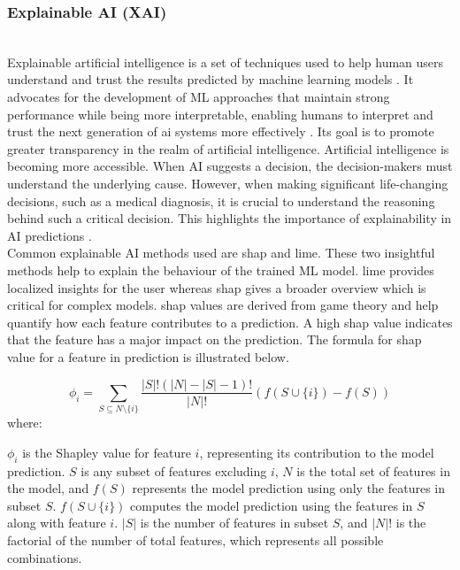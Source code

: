 \subsubsection{Explainable AI (XAI)} \leavevmode
\\Explainable artificial intelligence is a set of techniques used to help human users understand and trust the results predicted by machine learning models \citep{ibm2023explainable}. It advocates for the development of ML approaches that maintain strong performance while being more interpretable, enabling humans to interpret and trust the next generation of \gls{ai} systems more effectively \citep{arrieta2020explainable}. Its goal is to promote greater transparency in the realm of artificial intelligence. Artificial intelligence is becoming more accessible. When AI suggests a decision, the decision-makers must understand the underlying cause. However, when making significant life-changing decisions, such as a medical diagnosis, it is crucial to understand the reasoning behind such a critical decision. This highlights the importance of explainability in AI predictions \citep{adadi2018peeking}. \\
Common explainable AI methods used are \gls{shap} and \gls{lime}. These two insightful methods help to explain the behaviour of the trained ML model. \gls{lime} provides localized insights for the user whereas \gls{shap} gives a broader overview which is critical for complex models. \gls{shap} values are derived from game theory and help quantify how each feature contributes to a prediction. A high \gls{shap} value indicates that the feature has a major impact on the prediction. The formula for \gls{shap} value for a feature in prediction is illustrated below.\citep{molnar2024interpretable}

\[
\phi_i= \sum_{S \subseteq N \setminus \{i\}} \frac{|S|! (|N| - |S| - 1)!}{|N|!} \left( f(S \cup \{i\}) - f(S) \right) 
\] 
where:  \vspace{0.5em}

\(\phi_i\) is the Shapley value for feature \(i\), representing its contribution to the model prediction. \(S\) is any subset of features excluding \(i\), \(N\) is the total set of features in the model, and \(f(S)\) represents the model prediction using only the features in subset \(S\). \(f(S \cup \{i\})\) computes the model prediction using the features in \(S\) along with feature \(i\). \(|S|\) is the number of features in subset \(S\), and \(|N|!\) is the factorial of the number of total features, which represents all possible combinations.


